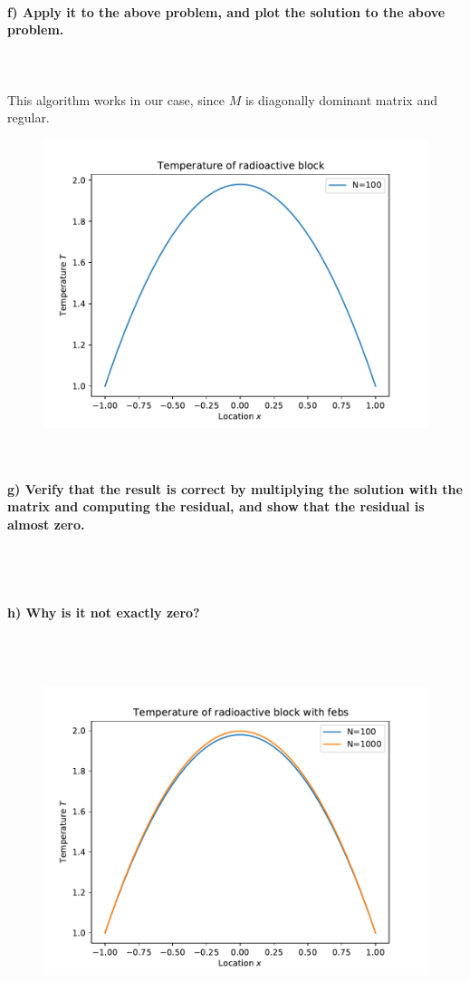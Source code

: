 \paragraph{
    f) Apply it to the above problem, and plot the solution to the
    above problem.
} \ \\
    \\
    This algorithm works in our case, since $M$ is diagonally 
    dominant matrix and regular.
    \begin{figure}[h!]
        \centering
        \includegraphics[width=.7\textwidth]{../figures/Aufg1f.pdf}
    \end{figure} \ \\ 

\paragraph{
    g) Verify that the result is correct by multiplying the solution
    with the matrix and computing the residual, and show that the
    residual is almost zero.
} \ \\
    \\

\paragraph{
    h) Why is it not exactly zero?
} \ \\
    \\
    \begin{figure}[h!]
        \centering
        \includegraphics[width=.7\textwidth]{../figures/Aufg1h.pdf}
    \end{figure} \ \\ 

